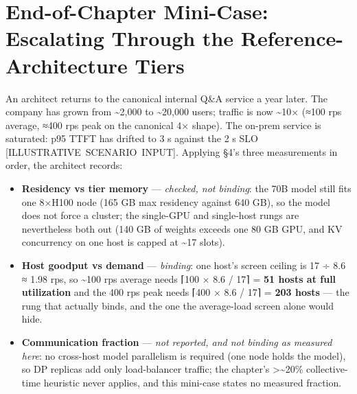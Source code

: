 \section{End-of-Chapter Mini-Case: Escalating Through the
Reference-Architecture
Tiers}\label{end-of-chapter-mini-case-escalating-through-the-reference-architecture-tiers}

An architect returns to the canonical internal Q\&A service a year
later. The company has grown from \textasciitilde2,000 to
\textasciitilde20,000 users; traffic is now \textasciitilde10× (≈100 rps
average, ≈400 rps peak on the canonical 4× shape). The on-prem service
is saturated: p95 TTFT has drifted to 3 s against the 2 s SLO
\mbox{{[}ILLUSTRATIVE SCENARIO INPUT{]}}. Applying §4's three measurements in
order, the architect records:

\begin{itemize}
\tightlist
\item
  \textbf{Residency vs tier memory} --- \emph{checked, not binding}: the
  70B model still fits one 8×H100 node (165 GB max residency against 640
  GB), so the model does not force a cluster; the single-GPU and
  single-host rungs are nevertheless both out (140 GB of weights exceeds
  one 80 GB GPU, and KV concurrency on one host is capped at
  \textasciitilde17 slots).
\item
  \textbf{Host goodput vs demand} --- \emph{binding}: one host's screen
  ceiling is 17 ÷ 8.6 ≈ 1.98 rps, so \textasciitilde100 rps average
  needs ⌈100 × 8.6 / 17⌉ = \textbf{51 hosts at full utilization} and the
  400 rps peak needs ⌈400 × 8.6 / 17⌉ = \textbf{203 hosts} --- the rung
  that actually binds, and the one the average-load screen alone would
  hide.
\item
  \textbf{Communication fraction} --- \emph{not reported, and not
  binding as measured here}: no cross-host model parallelism is required
  (one node holds the model), so DP replicas add only load-balancer
  traffic; the chapter's \textgreater\textasciitilde20\% collective-time
  heuristic never applies, and this mini-case states no measured
  fraction.
\end{itemize}


